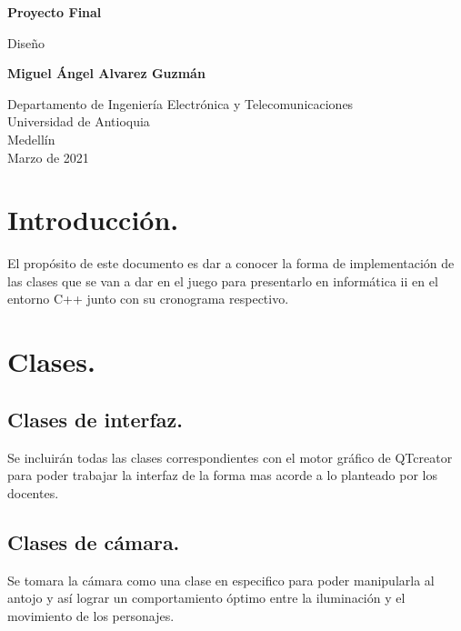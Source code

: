 \documentclass{article}
\begin{document}
\begin{titlepage}
    \begin{center}
        \vspace*{1cm}
            
        \Huge
        \textbf{Proyecto Final}
            
        \vspace{0.5cm}
        \LARGE
        Diseño
            
        \vspace{1.5cm}
            
        \textbf{Miguel Ángel Alvarez Guzmán}
            
        \vfill
            
        \vspace{0.8cm}
            
        \Large
        Departamento de Ingeniería Electrónica y Telecomunicaciones\\
        Universidad de Antioquia\\
        Medellín\\
        Marzo de 2021
            
    \end{center}
\end{titlepage}

\tableofcontents
\newpage
\section{Introducción.}\label{intro}
El propósito de este documento es dar a conocer la forma de implementación de las clases que se van a dar en el juego para presentarlo en informática ii en el entorno C++ junto con su cronograma respectivo.
\section{Clases.} \label{contenido}
\subsection{Clases de interfaz.}
Se incluirán todas las clases correspondientes con el motor gráfico de QTcreator para poder trabajar la interfaz de la forma mas acorde a lo planteado por los docentes.
\subsection{Clases de cámara.}
Se tomara la cámara como una clase en especifico para poder manipularla al antojo y así lograr un comportamiento óptimo entre la iluminación y el movimiento de los personajes.
\end{document}
